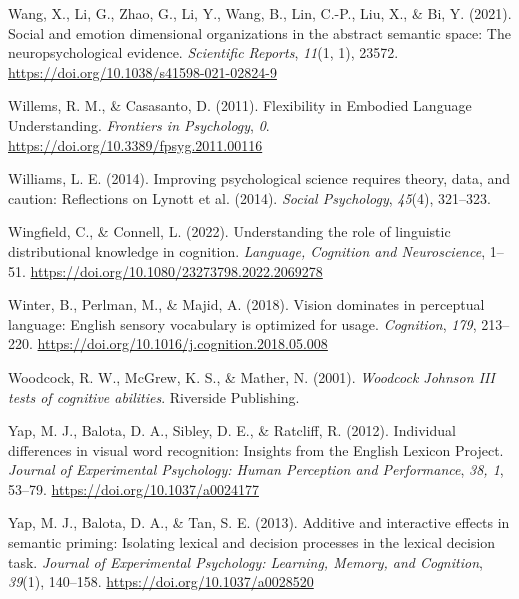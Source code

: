 \documentclass[
  12pt,
  man,floatsintext]{apa7}
\newlength{\cslhangindent}
\newlength{\cslentryspacingunit} %
\newenvironment{CSLReferences}[2] %
 {%
  \setlength{\parindent}{0pt}
  \ifodd #1
  \let\oldpar\par
  \def\par{\hangindent=\cslhangindent\oldpar}
  \fi
  \setlength{\parskip}{#2\cslentryspacingunit}
 }%
 {}
\begin{document}
\begin{CSLReferences}{1}{0}
\leavevmode{}%
Wang, X., Li, G., Zhao, G., Li, Y., Wang, B., Lin, C.-P., Liu, X., \& Bi, Y. (2021). Social and emotion dimensional organizations in the abstract semantic space: The neuropsychological evidence. \emph{Scientific Reports}, \emph{11}(1, 1), 23572. \url{https://doi.org/10.1038/s41598-021-02824-9}

\leavevmode{}%
Willems, R. M., \& Casasanto, D. (2011). Flexibility in {Embodied Language Understanding}. \emph{Frontiers in Psychology}, \emph{0}. \url{https://doi.org/10.3389/fpsyg.2011.00116}

\leavevmode{}%
Williams, L. E. (2014). Improving psychological science requires theory, data, and caution: {Reflections} on {Lynott} et al. (2014). \emph{Social Psychology}, \emph{45}(4), 321--323.

\leavevmode{}%
Wingfield, C., \& Connell, L. (2022). Understanding the role of linguistic distributional knowledge in cognition. \emph{Language, Cognition and Neuroscience}, 1--51. \url{https://doi.org/10.1080/23273798.2022.2069278}

\leavevmode{}%
Winter, B., Perlman, M., \& Majid, A. (2018). Vision dominates in perceptual language: {English} sensory vocabulary is optimized for usage. \emph{Cognition}, \emph{179}, 213--220. \url{https://doi.org/10.1016/j.cognition.2018.05.008}

\leavevmode{}%
Woodcock, R. W., McGrew, K. S., \& Mather, N. (2001). \emph{Woodcock {Johnson III} tests of cognitive abilities}. {Riverside Publishing}.

\leavevmode{}%
Yap, M. J., Balota, D. A., Sibley, D. E., \& Ratcliff, R. (2012). Individual differences in visual word recognition: {Insights} from the {English Lexicon Project}. \emph{Journal of Experimental Psychology: Human Perception and Performance}, \emph{38, 1}, 53--79. \url{https://doi.org/10.1037/a0024177}

\leavevmode{}%
Yap, M. J., Balota, D. A., \& Tan, S. E. (2013). Additive and interactive effects in semantic priming: {Isolating} lexical and decision processes in the lexical decision task. \emph{Journal of Experimental Psychology: Learning, Memory, and Cognition}, \emph{39}(1), 140--158. \url{https://doi.org/10.1037/a0028520}


\end{CSLReferences}
\end{document}
